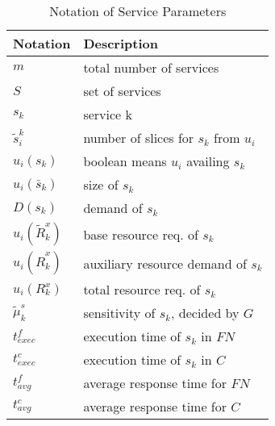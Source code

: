 \begin{table}[!ht]
\centering
\caption{Notation of Service Parameters}
\begin{tabular}{| l | l | }
	\hline
	\bf{Notation} & \bf{Description} \\
	\hline
    $m$ & total number of services \\
    \hline    
    ${S}$ & set of services \\
    \hline
	${s_k}$ & service k \\
    \hline    
	${\tilde{s}_i^k}$ & number of slices for $s_k$ from $u_i$ \\
    \hline    
	${u_i(s_k)}$ & boolean means $u_i$ availing $s_k$ \\
    \hline    
    ${u_i(\bar{s}_k)}$ & size of $s_k$ \\
    \hline    
	${D({s}_k)}$ & demand of $s_k$ \\
    \hline    
    ${u_i(\tilde{R}_k^x)}$ & base resource req. of $s_k$ \\
    \hline    
    ${u_i(\hat{R}_k^x)}$ & auxiliary resource demand of $s_k$ \\
    \hline    
    ${u_i(R_k^x)}$ & total resource req. of $s_k$ \\
    \hline    
    $\tilde{\mu}_k^s$ & sensitivity of $s_k$, decided by $G$ \\
    \hline    
    $t^f_{exec}$ & execution time of $s_k$ in $FN$ \\
    \hline   
    $t^c_{exec}$ & execution time of $s_k$ in $C$ \\
    \hline   
    $t^f_{avg}$ & average response time for $FN$ \\
    \hline   
    $t^c_{avg}$ & average response time for $C$  \\ 
    \hline   
\end{tabular}
\label{tab:service}
\end{table}